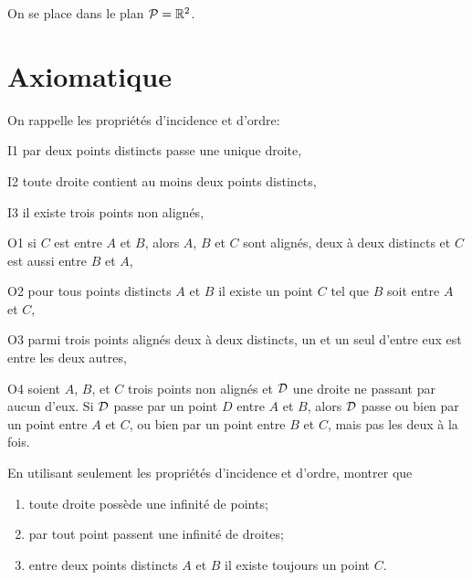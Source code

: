 \documentclass[a4paper,11pt,reqno]{amsart}
\begin{document}

\begin{convention}
  On se place dans le plan $\mathcal{P}=\mathbb{R}^2$.
\end{convention}


\section{Axiomatique}

On rappelle les propriétés d'incidence et d'ordre:\\[-1.7\baselineskip]
\begin{multicols}{2}\small
  \begin{axioms}[leftmargin=3.5em]
    \item[I1] par deux points distincts passe une unique droite,
    \item[I2] toute droite contient au moins deux points distincts,
    \item[I3] il existe trois points non alignés,
    \item[O1] si $C$ est entre $A$ et $B$, alors $A$, $B$ et $C$ sont alignés, deux à deux distincts et $C$ est aussi entre $B$ et $A$,
    \item[O2] pour tous points distincts $A$ et $B$ il existe un point $C$ tel que $B$ soit entre $A$ et $C$,
    \item[O3] parmi trois points alignés deux à deux distincts, un et un seul d'entre eux est entre les deux autres,
    \item[O4] soient $A$, $B$, et $C$ trois points non alignés et $\mathcal{D}$ une droite ne passant par aucun d'eux. Si $\mathcal{D}$ passe par un point $D$ entre $A$ et $B$, alors $\mathcal{D}$ passe ou bien par un point entre $A$ et $C$, ou bien par un point entre $B$ et $C$, mais pas les deux à la fois.
  \end{axioms}
\end{multicols}\vspace{7pt}

\begin{exo}

  En utilisant seulement les propriétés d'incidence et d'ordre, montrer que
  \begin{enumerate}
    \item toute droite possède une infinité de points;
    \item par tout point passent une infinité de droites;
    \item entre deux points distincts $A$ et $B$ il existe toujours un point $C$.
  \end{enumerate}
\end{exo}
\end{document}
